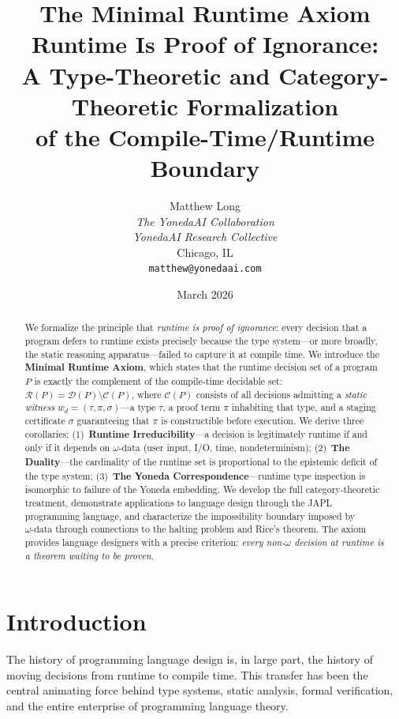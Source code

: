 \documentclass[11pt]{article}
\title{\textbf{The Minimal Runtime Axiom} \\[0.5em]
  \large Runtime Is Proof of Ignorance: \\
  A Type-Theoretic and Category-Theoretic Formalization \\
  of the Compile-Time/Runtime Boundary}
\author{
  Matthew Long \\
  \textit{The YonedaAI Collaboration} \\
  \textit{YonedaAI Research Collective} \\
  Chicago, IL \\
  \texttt{matthew@yonedaai.com}
}
\date{March 2026}
\newcommand{\DP}{\mathcal{D}(P)}
\newcommand{\CP}{\mathcal{C}(P)}
\newcommand{\RP}{\mathcal{R}(P)}
\newcommand{\witness}{w_d}
\newcommand{\omegadata}{\omega\text{-data}}
\begin{document}
\maketitle

\begin{abstract}
We formalize the principle that \emph{runtime is proof of ignorance}: every decision
that a program defers to runtime exists precisely because the type system---or more
broadly, the static reasoning apparatus---failed to capture it at compile time. We
introduce the \textbf{Minimal Runtime Axiom}, which states that the runtime decision
set of a program $P$ is exactly the complement of the compile-time decidable set:
$\RP = \DP \setminus \CP$, where $\CP$ consists of all decisions admitting a
\emph{static witness} $\witness = (\tau, \pi, \sigma)$---a type $\tau$, a proof term
$\pi$ inhabiting that type, and a staging certificate $\sigma$ guaranteeing that $\pi$
is constructible before execution. We derive three corollaries: (1)~\textbf{Runtime
Irreducibility}---a decision is legitimately runtime if and only if it depends on
$\omegadata$ (user input, I/O, time, nondeterminism); (2)~\textbf{The Duality}---the
cardinality of the runtime set is proportional to the epistemic deficit of the type
system; (3)~\textbf{The Yoneda Correspondence}---runtime type inspection is isomorphic
to failure of the Yoneda embedding. We develop the full category-theoretic treatment,
demonstrate applications to language design through the JAPL programming language, and
characterize the impossibility boundary imposed by $\omegadata$ through connections to
the halting problem and Rice's theorem. The axiom provides language designers with a
precise criterion: \emph{every non-$\omega$ decision at runtime is a theorem waiting
to be proven}.
\end{abstract}

\tableofcontents
\newpage

\section{Introduction}
\label{sec:introduction}

The history of programming language design is, in large part, the history of moving
decisions from runtime to compile time. This transfer has been the central animating
force behind type systems, static analysis, formal verification, and the entire
enterprise of programming language theory.
\end{document}
